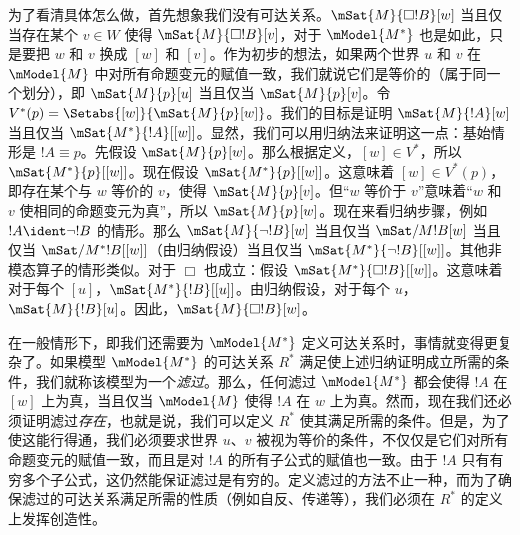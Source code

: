 \documentclass[../../../include/open-logic-section]{subfiles}
\begin{document}
为了看清具体怎么做，首先想象我们没有可达关系。$\mSat{M}{\Box !B}[w]$ 当且仅当存在某个 $v \in W$ 使得 $\mSat{M}{\Box !B}[v]$，对于 $\mModel{M^*}$ 也是如此，只是要把 $w$ 和 $v$ 换成 $[w]$ 和 $[v]$。作为初步的想法，如果两个世界 $u$ 和 $v$ 在 $\mModel{M}$ 中对所有命题变元的赋值一致，我们就说它们是等价的（属于同一个划分），即 $\mSat{M}{p}[u]$ 当且仅当 $\mSat{M}{p}[v]$。令 $V^*(p) = \Setabs{[w]}{\mSat{M}{p}[w]}$。我们的目标是证明 $\mSat{M}{!A}[w]$ 当且仅当 $\mSat{M^*}{!A}[{[w]}]$。显然，我们可以用归纳法来证明这一点：基始情形是 $!A \equiv p$。先假设 $\mSat{M}{p}[w]$。那么根据定义，$[w] \in V^*$，所以 $\mSat{M^*}{p}[{[w]}]$。现在假设 $\mSat{M^*}{p}[{[w]}]$。这意味着 $[w] \in V^*(p)$，即存在某个与 $w$ 等价的 $v$，使得 $\mSat{M}{p}[v]$。但“$w$ 等价于 $v$”意味着“$w$ 和 $v$ 使相同的命题变元为真”，所以 $\mSat{M}{p}[w]$。现在来看归纳步骤，例如 $!A \ident \lnot !B$ 的情形。那么 $\mSat{M}{\lnot !B}[w]$ 当且仅当 $\mSat/{M}{!B}[w]$ 当且仅当 $\mSat/{M^*}{!B}[{[w]}]$（由归纳假设）当且仅当 $\mSat{M^*}{\lnot !B}[{[w]}]$。其他非模态算子的情形类似。对于 $\Box$ 也成立：假设 $\mSat{M^*}{\Box
  !B}[{[w]}]$。这意味着对于每个 $[u]$，$\mSat{M^*}{!B}[{[u]}]$。由归纳假设，对于每个 $u$，$\mSat{M}{!B}[u]$。因此，$\mSat{M}{\Box !B}[w]$。

在一般情形下，即我们还需要为 $\mModel{M^*}$ 定义可达关系时，事情就变得更复杂了。如果模型 $\mModel{M^*}$ 的可达关系 $R^*$ 满足使上述归纳证明成立所需的条件，我们就称该模型为一个\emph{滤过}。那么，任何滤过 $\mModel{M^*}$ 都会使得 $!A$ 在 $[w]$ 上为真，当且仅当 $\mModel{M}$ 使得 $!A$ 在 $w$ 上为真。然而，现在我们还必须证明滤过\emph{存在}，也就是说，我们可以定义 $R^*$ 使其满足所需的条件。但是，为了使这能行得通，我们必须要求世界 $u$、$v$ 被视为等价的条件，不仅仅是它们对所有命题变元的赋值一致，而且是对 $!A$ 的所有子公式的赋值也一致。由于 $!A$ 只有有穷多个子公式，这仍然能保证滤过是有穷的。定义滤过的方法不止一种，而为了确保滤过的可达关系满足所需的性质（例如自反、传递等），我们必须在 $R^*$ 的定义上发挥创造性。
\end{document}
